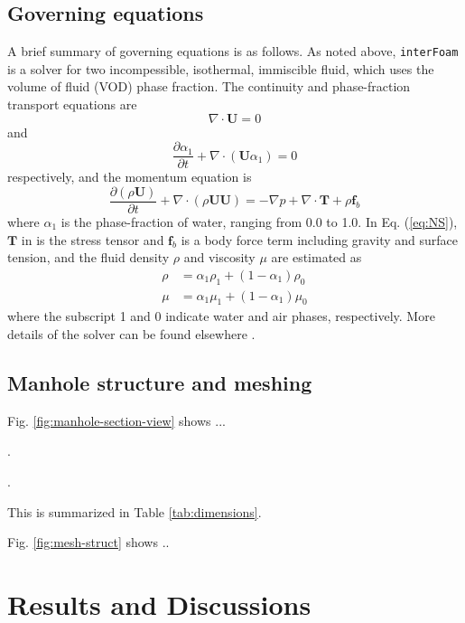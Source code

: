 \subsection{Governing equations}

A brief summary of governing equations is as follows. As noted above,
\texttt{interFoam} is a solver for two incompessible, isothermal,
immiscible fluid, which uses the volume of fluid (VOD) phase fraction.
The continuity and phase-fraction transport equations are 
\begin{equation}
\nabla\cdot\bm{U}=0
\end{equation}
and 
\begin{equation}
\frac{\partial\alpha_{1}}{\partial t}+\nabla\cdot\left(\bm{U}\alpha_{1}\right)=0
\end{equation}
respectively, and the momentum equation is 
\begin{equation}
\frac{\partial\left(\rho\bm{U}\right)}{\partial t}+\nabla\cdot\left(\rho\bm{U}\bm{U}\right)=-\nabla p+\nabla\cdot\bm{T}+\rho\bm{f}_{b}\label{eq:NS}
\end{equation}
where $\alpha_{1}$ is the phase-fraction of water, ranging from 0.0
to 1.0. In Eq. (\ref{eq:NS}), $\bm{T}$ in is the stress tensor and
$\bm{f}_{b}$ is a body force term including gravity and surface tension,
and the fluid density $\rho$ and viscosity $\mu$ are estimated as
\begin{align}
\rho & =\alpha_{1}\rho_{1}+\left(1-\alpha_{1}\right)\rho_{0}\\
\mu & =\alpha_{1}\mu_{1}+\left(1-\alpha_{1}\right)\mu_{0}
\end{align}
where the subscript 1 and 0 indicate water and air phases, respectively.
More details of the solver can be found elsewhere \citep{Weller-CiP-1998-10.1063_1.168744,Manual-OpenFOAMFoundation-2016}.

\subsection{Manhole structure and meshing}

Fig. \ref{fig:manhole-section-view} shows ... 

.

.

This is summarized in Table \ref{tab:dimensions}.

Fig. \ref{fig:mesh-struct} shows .. 

\section{Results and Discussions}

